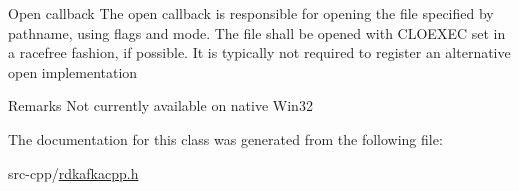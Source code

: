 Open callback The open callback is responsible for opening the file specified by {\ttfamily pathname}, using {\ttfamily flags} and {\ttfamily mode}. The file shall be opened with {\ttfamily CLOEXEC} set in a racefree fashion, if possible. It is typically not required to register an alternative open implementation

\begin{DoxyRemark}{Remarks}
Not currently available on native Win32 
\end{DoxyRemark}


The documentation for this class was generated from the following file:\begin{DoxyCompactItemize}
\item 
src-\/cpp/\hyperlink{rdkafkacpp_8h}{rdkafkacpp.h}\end{DoxyCompactItemize}
